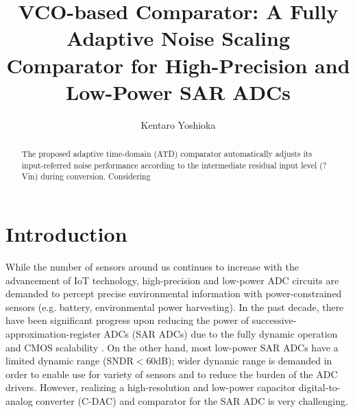 \documentclass[journal]{IEEEtran}
\title{\LARGE \bf
VCO-based Comparator: A Fully Adaptive Noise Scaling Comparator for High-Precision and Low-Power SAR ADCs
}
\author{Kentaro Yoshioka%
}
\begin{document}
\maketitle
\thispagestyle{empty}
\pagestyle{empty}

\begin{abstract}
The proposed adaptive time-domain (ATD) comparator automatically adjusts its input-referred noise performance according to the intermediate residual input level (?Vin) during conversion. Considering



\end{abstract}

\section{Introduction}
While the number of sensors around us continues to increase with the advancement of IoT technology, high-precision and low-power ADC circuits are demanded to percept precise environmental information with power-constrained sensors (e.g. battery, environmental power harvesting). In the past decade, there have been significant progress upon reducing the power of successive-approximation-register ADCs (SAR ADCs) due to the fully dynamic operation and CMOS scalability \cite{van201010,shikata20120,yoshioka201010,yoshioka20148,zhu201010,tai201411}. On the other hand, most low-power SAR ADCs have a limited dynamic range (SNDR$<$60dB); wider dynamic range is demanded in order to enable use for variety of sensors and to reduce the burden of the ADC drivers. However, realizing a high-resolution and low-power capacitor digital-to-analog converter (C-DAC) and comparator for the SAR ADC is very challenging.

\end{document}

